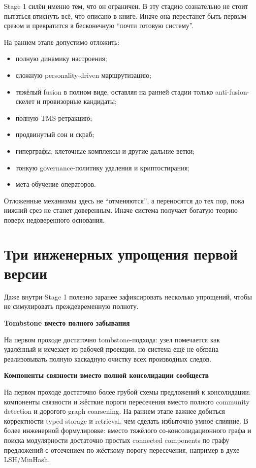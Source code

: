 Stage 1 силён именно тем, что он ограничен. В эту стадию сознательно не стоит
пытаться втиснуть всё, что описано в книге. Иначе она перестанет быть первым
срезом и превратится в бесконечную ``почти готовую систему''.

На раннем этапе допустимо отложить:

\begin{itemize}\itemsep2pt
\item полную динамику настроения;
\item сложную personality-driven маршрутизацию;
\item тяжёлый fusion в полном виде, оставляя на ранней стадии только
anti-fusion-скелет и провизорные кандидаты;
\item полную TMS-ретракцию;
\item продвинутый сон и скраб;
\item гиперграфы, клеточные комплексы и другие дальние ветки;
\item тонкую governance-политику удаления и криптостирания;
\item мета-обучение операторов.
\end{itemize}

\begin{intuition}
Отложенные механизмы здесь не ``отменяются'', а переносятся до тех пор, пока
нижний срез не станет доверенным. Иначе система получает богатую теорию
поверх недоверенного основания.
\end{intuition}

\section{Три инженерных упрощения первой версии}

Даже внутри Stage 1 полезно заранее зафиксировать несколько упрощений, чтобы
не симулировать преждевременную полноту.

\textbf{Tombstone вместо полного забывания}

На первом проходе достаточно tombstone-подхода: узел помечается как удалённый
и исчезает из рабочей проекции, но система ещё не обязана реализовывать
полную каскадную очистку всех производных следов.

\textbf{Компоненты связности вместо полной консолидации сообществ}

На первом проходе достаточно более грубой схемы предложений к консолидации:
компоненты связности и жёсткие пороги пересечения вместо полного community
detection и дорогого graph coarsening. На раннем этапе важнее добиться
корректности typed storage и retrieval, чем сделать избыточно умное слияние. В
более инженерной формулировке: вместо тяжёлого со-консолидационного графа и
поиска модулярности достаточно простых connected components по графу
предложений с отсечением по жёсткому порогу пересечения, например в духе
LSH/MinHash.

